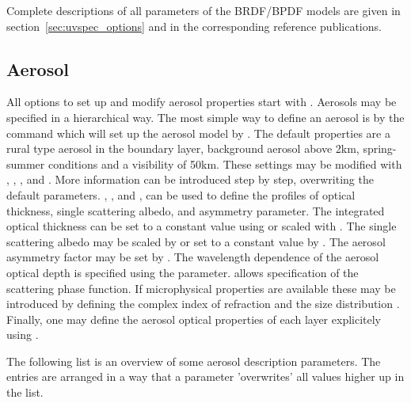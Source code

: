 Complete descriptions of all parameters of the BRDF/BPDF models are given in section~\ref{sec:uvspec_options} and in the corresponding reference publications.

\subsection{Aerosol}
All options to set up and modify aerosol properties start with
.  Aerosols may be specified in a hierarchical
way. The most simple way to define an aerosol is by the command
 which will set up the aerosol model by
\citet{shettle89}. The default properties are a rural
type aerosol in the boundary layer, background aerosol above 2km,
spring-summer conditions and a visibility of 50km. These settings may
be modified with , ,
, and . More
information can be introduced step by step, overwriting the default
parameters. , , and
, can be used to define the profiles of
optical thickness, single scattering albedo, and asymmetry
parameter. The integrated optical thickness can be set to a constant
value using  or scaled with
. The single scattering albedo may be scaled
by  or set to a constant value by
.  The aerosol asymmetry factor may be set by
. The wavelength dependence of the aerosol
optical depth is specified using the 
parameter.  allows specification of the
scattering phase function. If microphysical properties are available
these may be introduced by defining the complex index of refraction
 and the
size distribution . Finally, one may
define the aerosol optical properties of each layer explicitely using
.

The following list is an overview of some aerosol description
parameters. The entries are arranged in a way that a parameter
'overwrites' all values higher up in the list.

